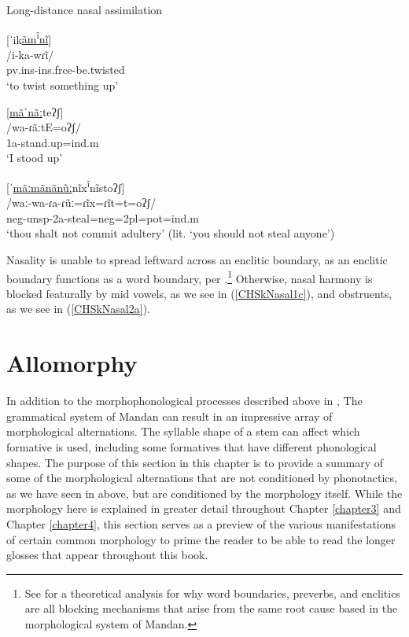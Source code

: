 \begin{exe}
    \item\label{CHSkNasal2} Long-distance nasal assimilation

    \begin{xlist}
        \item\label{CHSkNasal2a} \glll \textnormal{[ˈik\uline{ãm\textsuperscript{ĩ}nĩ}]}\\
        /i-ka-wɾĩ/\\
        pv.ins-ins.frce-\textnormal{be.twisted}\\
        \glt `to twist something up'
        
        \item\label{CHSkNasal2b} \glll \textnormal{[\uline{mãˈnãː}teʔʃ]}\\
        /wa-ɾãːtE=oʔʃ/\\
        1a-\textnormal{stand.up}=ind.m\\
        \glt `I stood up'

        \item\label{CHSkNasal2c} \glll \textnormal{[ˈ\uline{mãːmãnãnũː}nĩx\textsuperscript{ĩ}nĩstoʔʃ]}\\
        /waː-wa-ɾa-ɾũː=ɾĩx=ɾĩt=t=oʔʃ/\\
        neg-unsp-2a-\textnormal{steal}=neg=2pl=pot=ind.m\\
        \glt `thou shalt not commit adultery' (lit. `you should not steal anyone')
    \end{xlist}
\end{exe}

Nasality is unable to spread leftward across an enclitic boundary, as an enclitic boundary functions as a word boundary, per \citet[269]{kasak2019}.\footnote{See \citet{kasak2019} for a theoretical analysis for why word boundaries, preverbs, and enclitics are all blocking mechanisms that arise from the same root cause based in the morphological system of Mandan.} Otherwise, nasal harmony is blocked featurally by mid vowels, as we see in (\ref{CHSkNasal1c}), and obstruents, as we see in (\ref{CHSkNasal2a}).

\section{Allomorphy}\label{CHSk3}

In addition to the morphophonological processes described above in , The grammatical system of Mandan can result in an impressive array of morphological alternations. The syllable shape of a stem can affect which formative is used, including some formatives that have different phonological shapes. The purpose of this section in this chapter is to provide a summary of some of the morphological alternations that are not conditioned by phonotactics, as we have seen in  above, but are conditioned by the morphology itself. While the morphology here is explained in greater detail throughout Chapter \ref{chapter3} and Chapter \ref{chapter4}, this section serves as a preview of the various manifestations of certain common morphology to prime the reader to be able to read the longer glosses that appear throughout this book.

